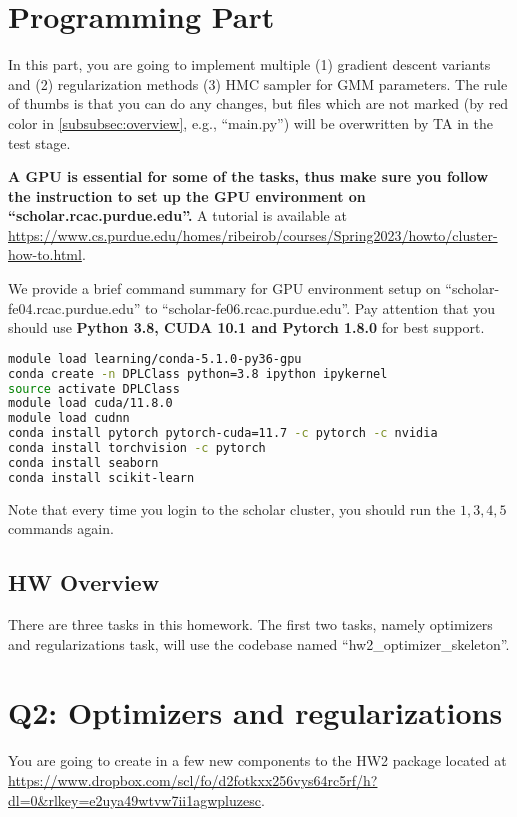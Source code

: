 \section*{Programming Part}

In this part, you are going to implement multiple (1) gradient descent variants
and (2) regularization methods (3) HMC sampler for GMM parameters.
The rule of thumbs is that you can do any changes, but files which are not
marked (by red color in \ref{subsubsec:overview}, e.g.,
``main.py'') will be overwritten by TA in the test stage.

\hfill

\textbf{A GPU is essential for some of the tasks, thus make sure you follow the instruction to set up the GPU environment on ``scholar.rcac.purdue.edu''.} A tutorial is available at\\
{\scriptsize \url{https://www.cs.purdue.edu/homes/ribeirob/courses/Spring2023/howto/cluster-how-to.html}}.


We provide a brief command summary for GPU environment setup on ``scholar-fe04.rcac.purdue.edu'' to ``scholar-fe06.rcac.purdue.edu''.
Pay attention that you should use {\bf Python 3.8, CUDA 10.1 and Pytorch 1.8.0} for best support.
\begin{lstlisting}[language=bash]
module load learning/conda-5.1.0-py36-gpu
conda create -n DPLClass python=3.8 ipython ipykernel
source activate DPLClass
module load cuda/11.8.0
module load cudnn
conda install pytorch pytorch-cuda=11.7 -c pytorch -c nvidia
conda install torchvision -c pytorch
conda install seaborn
conda install scikit-learn
\end{lstlisting}

Note that every time you login to the scholar cluster, you should run the $1,3,4,5$ commands again.

\subsection*{HW Overview}
\label{subsubsec:overview}
There are three tasks in this homework. The first two tasks, namely optimizers and regularizations task, will use the codebase named ``hw2\_optimizer\_skeleton''.

\section{Q2: Optimizers and regularizations}
You are going to create in a few new components to the HW2 package located at \\ \url{https://www.dropbox.com/scl/fo/d2fotkxx256vys64rc5rf/h?dl=0&rlkey=e2uya49wtvw7ii1agwpluzesc}.

